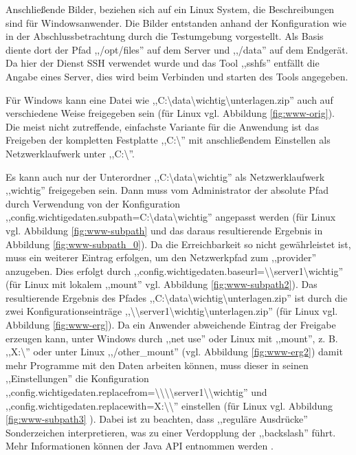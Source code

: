 \documentclass[oneside, ngerman, toc=bibliography,bibliography=totoc,listof=entryprefix, open=right,numbers=noenddot,fontsize=12pt]{scrbook}
\begin{document}
Anschließende Bilder, beziehen sich auf ein Linux System, die Beschreibungen sind für Windowsanwender.
Die Bilder entstanden anhand der Konfiguration wie in der Abschlussbetrachtung durch die Testumgebung vorgestellt. Als Basis diente dort der Pfad ,,/opt/files'' auf dem Server und ,,/data'' auf dem Endgerät.
Da hier der Dienst SSH verwendet wurde und das Tool ,,sshfs'' entfällt die Angabe eines Server, dies wird beim Verbinden und starten des Tools angegeben.


Für Windows kann eine Datei wie ,,C:\textbackslash{}data\textbackslash{}wichtig\textbackslash{}unterlagen.zip'' auch auf verschiedene Weise freigegeben sein (für Linux vgl. Abbildung \ref{fig:www-orig}).
Die meist nicht zutreffende, einfachste Variante für die Anwendung ist das Freigeben der kompletten Festplatte ,,C:\textbackslash{}'' mit anschließendem Einstellen als Netzwerklaufwerk unter ,,C:\textbackslash{}''.


Es kann auch nur der Unterordner ,,C:\textbackslash{}data\textbackslash{}wichtig'' als Netzwerklaufwerk ,,wichtig'' freigegeben sein. Dann muss vom Administrator der absolute Pfad durch Verwendung von der Konfiguration ,,config.wichtigedaten.subpath=C:\textbackslash{}data\textbackslash{}wichtig'' angepasst werden (für Linux vgl. Abbildung \ref{fig:www-subpath} und das daraus resultierende Ergebnis in Abbildung \ref{fig:www-subpath_0}). Da die Erreichbarkeit so nicht gewährleistet ist, muss ein weiterer Eintrag erfolgen, um den Netzwerkpfad zum ,,provider'' anzugeben. Dies erfolgt durch ,,config.wichtigedaten.baseurl=\textbackslash{}\textbackslash{}server1\textbackslash{}wichtig'' (für Linux mit lokalem ,,mount'' vgl. Abbildung  \ref{fig:www-subpath2}). Das resultierende Ergebnis des Pfades ,,C:\textbackslash{}data\textbackslash{}wichtig\textbackslash{}unterlagen.zip'' ist durch die zwei Konfigurationseinträge  ,,\textbackslash{}\textbackslash{}server1\textbackslash{}wichtig\textbackslash{}unterlagen.zip'' (für Linux vgl. Abbildung \ref{fig:www-erg}). Da ein Anwender abweichende Eintrag der Freigabe erzeugen kann, unter Windows durch ,,net use'' oder Linux mit ,,mount'', z. B. ,,X:\textbackslash{}'' oder unter Linux ,,/other\_mount'' (vgl. Abbildung \ref{fig:www-erg2})  damit mehr Programme mit den Daten arbeiten können, muss dieser in seinen ,,Einstellungen'' die Konfiguration ,,config.wichtigedaten.replacefrom=\textbackslash{}\textbackslash{}\textbackslash{}\textbackslash{}server1\textbackslash{}\textbackslash{}wichtig'' und ,,config.wichtigedaten.replacewith=X:\textbackslash{}\textbackslash{}'' einstellen  (für Linux vgl. Abbildung \ref{fig:www-subpath3} ). Dabei ist zu beachten, dass ,,reguläre Ausdrücke'' Sonderzeichen interpretieren, was zu einer Verdopplung der ,,backslash'' führt. Mehr Informationen können der Java API entnommen werden  \cite{javaregex}.
\end{document}
